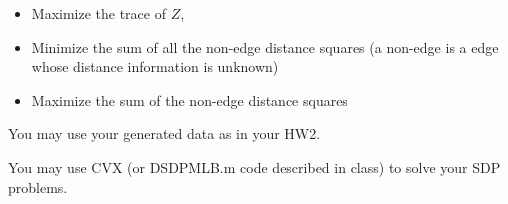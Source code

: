 \documentclass[12pt,letterpaper]{article}
\begin{document}
\begin{enumerate}
\begin{itemize}
\item Maximize the trace of $Z$,

\item Minimize the sum of all the non-edge distance squares (a non-edge is a edge whose distance information is unknown)

\item Maximize the sum of the non-edge distance squares
\end{itemize}
You may use your generated data as in your HW2. 

You may use CVX (or DSDPMLB.m code described in class) to solve your SDP problems.
\end{enumerate}
\end{document}
